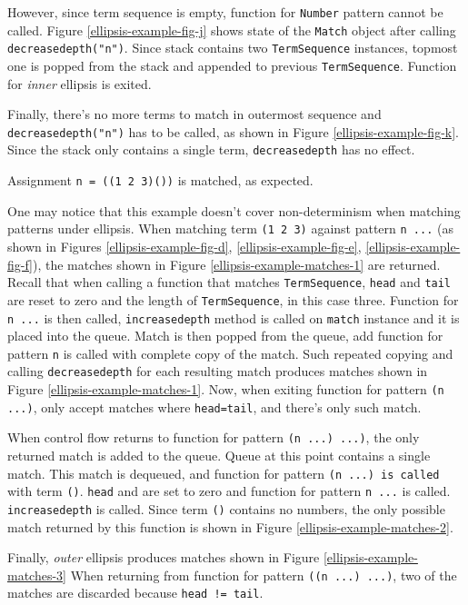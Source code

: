 However, since term sequence is empty, function for \texttt{Number} pattern cannot be called. Figure \ref{ellipsis-example-fig-j} shows state of the \texttt{Match} object after calling \texttt{decreasedepth("n")}. Since stack contains two \texttt{TermSequence} instances, topmost one is popped from the stack and appended to previous \texttt{TermSequence}. Function for \textit{inner} ellipsis is exited.

Finally, there's no more terms to match in outermost sequence and \texttt{decreasedepth("n")} has to be called, as shown in Figure \ref{ellipsis-example-fig-k}. Since the stack only contains a single term, \texttt{decreasedepth} has no effect.

Assignment \texttt{n = ((1 2 3)())} is matched, as expected.

One may notice that this example doesn't cover non-determinism when matching patterns under ellipsis. When matching term \texttt{(1 2 3)} against pattern \texttt{n ...} (as shown in Figures \ref{ellipsis-example-fig-d}, \ref{ellipsis-example-fig-e}, \ref{ellipsis-example-fig-f}), the matches shown in Figure \ref{ellipsis-example-matches-1} are returned. Recall that when calling a function that matches \texttt{TermSequence}, \texttt{head} and \texttt{tail} are reset to zero and the length of \texttt{TermSequence}, in this case three. Function for \texttt{n ...} is then called, \texttt{increasedepth} method is called on \texttt{match} instance and it is placed into the queue. Match is then popped from the queue, add function for pattern \texttt{n} is called with complete copy of the match. Such repeated copying and calling \texttt{decreasedepth} for each resulting match produces matches shown in Figure \ref{ellipsis-example-matches-1}. Now, when exiting function for pattern \texttt{(n ...)}, only accept matches where \texttt{head=tail}, and there's only such match.

When control flow returns to function for pattern \texttt{(n ...) ...)}, the only returned match is added to the queue. Queue at this point contains a single match. This match is dequeued, and function for pattern \texttt{(n ...) is called} with term \texttt{()}. \texttt{head} and  are set to zero and function for pattern \texttt{n ...} is called. \texttt{increasedepth} is called. Since term \texttt{()} contains no numbers, the only possible match returned by this function is shown in Figure \ref{ellipsis-example-matches-2}.

Finally, \textit{outer} ellipsis produces matches shown in Figure \ref{ellipsis-example-matches-3} When returning from function for pattern \texttt{((n ...) ...)}, two of the matches are discarded because \texttt{head != tail}.






